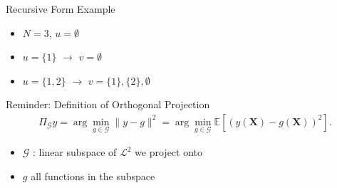 \begin{frame}{Recursive Form Example}
  \begin{itemize}
    \item<1-> $N = 3$, $u = \emptyset$
  \end{itemize}

  \begin{itemize}
    \item<3-> $u = \{1\}$ $\rightarrow$ $v = \emptyset$
  \end{itemize}

  \begin{itemize}
    \item<5-> $u = \{1,2\}$ $\rightarrow$ $v = \{1\}, \{2\}, \emptyset$
  \end{itemize}
\end{frame}



\begin{frame}{Reminder: Definition of Orthogonal Projection} %
  \begin{align*}
    \Pi_{\mathcal{G}}y = \arg\min_{g \in \mathcal{G}} \|y - g\|^2
= \arg\min_{g \in \mathcal{G}} \mathbb{E}[(y(\boldsymbol{X}) - g(\boldsymbol{X}))^2].
\end{align*}
  \begin{itemize}
    \item $\mathcal{G}$ : linear subspace of $\mathcal{L}^2$ we project onto
    \item $g$ all functions in the subspace
  \end{itemize}
\end{frame}

